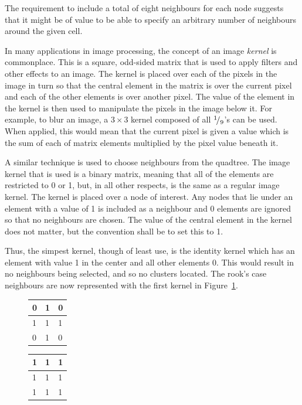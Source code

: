 The requirement to include a total of eight neighbours for each node suggests
that it might be of value to be able to specify an arbitrary number of
neighbours around the given cell.

In many applications in image processing, the concept of an image \emph{kernel}
is commonplace. This is a square, odd-sided matrix that is used to apply
filters and other effects to an image. The kernel is placed over each of the
pixels in the image in turn so that the central element in the matrix is over
the current pixel and each of the other elements is over another pixel. The
value of the element in the kernel is then used to manipulate the pixels in the
image below it. For example, to blur an image, a $3\times 3$ kernel composed of
all ${}^{1}\!/_{9}$'s can be used. When applied, this would mean that the
current pixel is given a value which is the sum of each of matrix elements
multiplied by the pixel value beneath it.

A similar technique is used to choose neighbours from the quadtree. The image
kernel that is used is a binary matrix, meaning that all of the elements are
restricted to 0 or 1, but, in all other respects, is the same as a regular
image kernel. The kernel is placed over a node of interest. Any nodes that lie
under an element with a value of 1 is included as a neighbour and 0 elements
are ignored so that no neighbours are chosen. The value of the central element
in the kernel does not matter, but the convention shall be to set this to 1.

Thus, the simpest kernel, though of least use, is the identity kernel which has
an element with value 1 in the center and all other elements 0. This would
result in no neighbours being selected, and so no clusters located. The rook's
case neighbours are now represented with the first kernel in
Figure~\ref{fig:kernel-neighbours}.

\begin{figure}[tbhp]
	\centering
	\begin{subtable}[b]{0.2\textwidth}
	\centering
		\begin{tabular}{|l|l|l|}
			\hline
			0 & 1 & 0 \\
			\hline
			1 & \cellcolor{lred}1 & 1 \\
			\hline
			0 & 1 & 0 \\
			\hline
		\end{tabular}
		\caption{}\label{fig:kernel-image-rooks}
	\end{subtable}%
	\quad
	\begin{subtable}[b]{0.2\textwidth}
	\centering
		\begin{tabular}{|l|l|l|}
			\hline
			1 & 1 & 1 \\
			\hline
			1 & \cellcolor{lred}1 & 1 \\
			\hline
			1 & 1 & 1 \\
			\hline
		\end{tabular}
		\caption{}\label{fig:kernel-image-all8}
	\end{subtable}
	\caption{}\label{fig:kernel-neighbours}
\end{figure}

